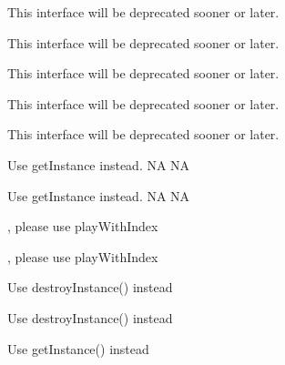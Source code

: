\begin{DoxyRefList}
This interface will be deprecated sooner or later.  
\item[\label{deprecated__deprecated000072}%
\Hypertarget{deprecated__deprecated000072}%
Member \hyperlink{classcocosbuilder_1_1CCBAnimationManager_afef9e870e31dc6e77da6862995fb8d1f}{cocosbuilder\+:\+:C\+C\+B\+Animation\+Manager\+:\+:run\+Animations} (const char $\ast$p\+Name)]This interface will be deprecated sooner or later. 

This interface will be deprecated sooner or later.  
\item[\label{deprecated__deprecated000073}%
\Hypertarget{deprecated__deprecated000073}%
Member \hyperlink{classcocosbuilder_1_1CCBAnimationManager_aa36b27e55afbd31f6f5b6a05bd662079}{cocosbuilder\+:\+:C\+C\+B\+Animation\+Manager\+:\+:run\+Animations} (int n\+Seq\+Id, float f\+Tween\+Duraiton)]This interface will be deprecated sooner or later. 

This interface will be deprecated sooner or later.  
\item[\label{deprecated__deprecated000047}%
\Hypertarget{deprecated__deprecated000047}%
Member \hyperlink{classCocosDenshion_1_1SimpleAudioEngine_a0ba9c4ae57006f7aad560f70d836ed75}{Cocos\+Denshion\+:\+:Simple\+Audio\+Engine\+:\+:shared\+Engine} ()]Use {\ttfamily get\+Instance} instead.  NA  NA 

Use {\ttfamily get\+Instance} instead.  NA  NA  
\item[\label{deprecated__deprecated000076}%
\Hypertarget{deprecated__deprecated000076}%
Member \hyperlink{classcocostudio_1_1ArmatureAnimation_a31461695f1c48a33f49fb9d9fecedee5}{cocostudio\+:\+:Armature\+Animation\+:\+:play\+By\+Index} (int animation\+Index, int duration\+To=-\/1, int loop=-\/1)], please use play\+With\+Index 

, please use play\+With\+Index  
\item[\label{deprecated__deprecated000078}%
\Hypertarget{deprecated__deprecated000078}%
Member \hyperlink{classcocostudio_1_1ArmatureDataManager_a408db55c27dbcaea97edcfed1a4ba66b}{cocostudio\+:\+:Armature\+Data\+Manager\+:\+:purge} ()]Use destroy\+Instance() instead 

Use destroy\+Instance() instead  
\item[\label{deprecated__deprecated000077}%
\Hypertarget{deprecated__deprecated000077}%
Member \hyperlink{classcocostudio_1_1ArmatureDataManager_a5f7ba0ce48d07b1aba63a2786c641607}{cocostudio\+:\+:Armature\+Data\+Manager\+:\+:shared\+Armature\+Data\+Manager} ()]Use get\+Instance() instead 


\end{DoxyRefList}
